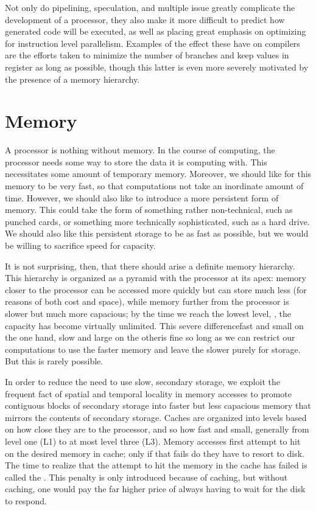 Not only do pipelining, speculation, and multiple issue greatly complicate the development of a processor, they also make it more difficult to predict how generated code will be executed, as well as placing great emphasis on optimizing for instruction level parallelism. Examples of the effect these have on compilers are the efforts taken to minimize the number of branches and keep values in register as long as possible, though this latter is even more severely motivated by the presence of a memory hierarchy.

\section{Memory}\label{background:computers:memory}
A processor is nothing without memory. In the course of computing, the processor needs some way to store the data it is computing with. This necessitates some amount of temporary memory. Moreover, we should like for this memory to be very fast, so that computations not take an inordinate amount of time. However, we should also like to introduce a more persistent form of memory. This could take the form of something rather non-technical, such as punched cards, or something more technically sophisticated, such as a hard drive. We should also like this persistent storage to be as fast as possible, but we would be willing to sacrifice speed for capacity.

It is not surprising, then, that there should arise a definite memory hierarchy. This hierarchy is organized as a pyramid with the processor at its apex: memory closer to the processor can be accessed more quickly but can store much less (for reasons of both cost and space), while memory further from the processor is slower but much more capacious; by the time we reach the lowest level, , the capacity has become virtually unlimited. This severe difference\empause fast and small on the one hand, slow and large on the other\empause is fine so long as we can restrict our computations to use the faster memory and leave the slower purely for storage. But this is rarely possible.

In order to reduce the need to use slow, secondary storage, we exploit the frequent fact of spatial and temporal locality in memory accesses to promote contiguous blocks of secondary storage into \empause faster but less capacious memory that mirrors the contents of secondary storage. Caches are organized into levels based on how close they are to the processor, and so how fast and small, generally from level one (L1) to at most level three (L3). Memory accesses first attempt to hit on the desired memory in cache; only if that fails do they have to resort to disk. The time to realize that the attempt to hit the memory in the cache has failed is called the . This penalty is only introduced because of caching, but without caching, one would pay the far higher price of always having to wait for the disk to respond.

